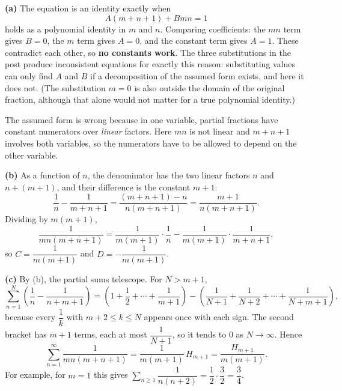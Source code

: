 \textbf{(a)} The equation is an identity exactly when
\[A(m+n+1)+Bmn=1\]
holds as a polynomial identity in $m$ and $n$. Comparing coefficients: the $mn$ term gives $B=0$, the $m$ term gives $A=0$, and the constant term gives $A=1$. These contradict each other, so \textbf{no constants work}. The three substitutions in the post produce inconsistent equations for exactly this reason: substituting values can only find $A$ and $B$ if a decomposition of the assumed form exists, and here it does not. (The substitution $m=0$ is also outside the domain of the original fraction, although that alone would not matter for a true polynomial identity.)

The assumed form is wrong because in one variable, partial fractions have constant numerators over \emph{linear} factors. Here $mn$ is not linear and $m+n+1$ involves both variables, so the numerators have to be allowed to depend on the other variable.

\textbf{(b)} As a function of $n$, the denominator has the two linear factors $n$ and $n+(m+1)$, and their difference is the constant $m+1$:
\[\dfrac{1}{n}-\dfrac{1}{m+n+1}=\dfrac{(m+n+1)-n}{n(m+n+1)}=\dfrac{m+1}{n(m+n+1)}.\]
Dividing by $m(m+1)$,
\[\dfrac{1}{mn(m+n+1)}=\dfrac{1}{m(m+1)}\cdot\dfrac{1}{n}-\dfrac{1}{m(m+1)}\cdot\dfrac{1}{m+n+1},\]
so $C=\boxed{\dfrac{1}{m(m+1)}}$ and $D=\boxed{-\dfrac{1}{m(m+1)}}$.

\textbf{(c)} By (b), the partial sums telescope. For $N>m+1$,
\[\sum_{n=1}^{N}\left(\dfrac{1}{n}-\dfrac{1}{n+m+1}\right)=\left(1+\dfrac{1}{2}+\cdots+\dfrac{1}{m+1}\right)-\left(\dfrac{1}{N+1}+\dfrac{1}{N+2}+\cdots+\dfrac{1}{N+m+1}\right),\]
because every $\dfrac{1}{k}$ with $m+2\le k\le N$ appears once with each sign. The second bracket has $m+1$ terms, each at most $\dfrac{1}{N+1}$, so it tends to $0$ as $N\to\infty$. Hence
\[\sum_{n=1}^{\infty}\dfrac{1}{mn(m+n+1)}=\dfrac{1}{m(m+1)}\,H_{m+1}=\boxed{\dfrac{H_{m+1}}{m(m+1)}}.\]
For example, for $m=1$ this gives $\displaystyle\sum_{n\ge1}\dfrac{1}{n(n+2)}=\dfrac{1}{2}\cdot\dfrac{3}{2}=\dfrac{3}{4}$.
